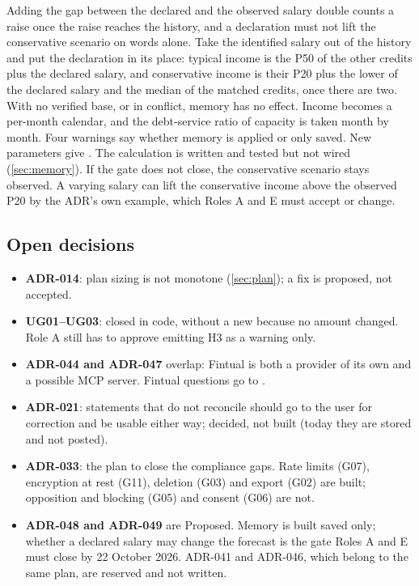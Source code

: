  Adding the gap between the declared and the observed salary double counts a raise once the raise reaches
the history, and a declaration must not lift the conservative scenario on words alone.
 Take the identified salary out of the history and put the declaration in its place:
typical income is the P50 of the other credits plus the declared salary, and conservative income is their P20 plus the
lower of the declared salary and the median of the matched credits, once there are two. With no verified base, or in
conflict, memory has no effect. Income becomes a per-month calendar, and the debt-service ratio of capacity is taken
month by month. Four warnings say whether memory is applied or only saved. New parameters give .
 The calculation is written and tested but not wired (\cref{sec:memory}). If the gate does not close,
the conservative scenario stays observed. A varying salary can lift the conservative income above the observed P20 by
the ADR's own example, which Roles A and E must accept or change.

\subsection*{Open decisions}
\begin{itemize}
  \item \textbf{ADR-014}: plan sizing is not monotone (\cref{sec:plan}); a fix is proposed, not accepted.
  \item \textbf{UG01--UG03}: closed in code, without a new  because no amount changed. Role A
    still has to approve emitting H3 as a warning only.
  \item \textbf{ADR-044 and ADR-047} overlap: Fintual is both a provider of its own and a possible MCP server. Fintual
    questions go to .
  \item \textbf{ADR-021}: statements that do not reconcile should go to the user for correction and be usable either way;
    decided, not built (today they are stored and not posted).
  \item \textbf{ADR-033}: the plan to close the compliance gaps. Rate limits (G07), encryption at rest (G11), deletion
    (G03) and export (G02) are built; opposition and blocking (G05) and consent (G06) are not.
  \item \textbf{ADR-048 and ADR-049} are Proposed. Memory is built saved only; whether a declared salary may change the
    forecast is the gate Roles A and E must close by 22 October 2026. ADR-041 and ADR-046, which belong to the same plan,
    are reserved and not written.
\end{itemize}
